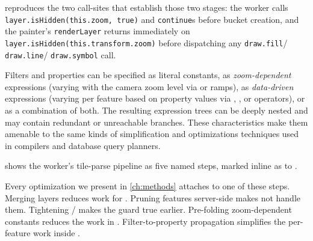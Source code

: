 \begin{description}
\begin{description}
 reproduces the two call-sites that establish those two stages: the worker calls \texttt{layer.isHidden(this.zoom, true)} and \texttt{continue}s before bucket creation, and the painter's \texttt{renderLayer} returns immediately on \texttt{layer.isHidden(this.transform.zoom)} before dispatching any \texttt{draw.fill}/ \texttt{draw.line}/ \texttt{draw.symbol} call.
\end{description}
\end{description}

Filters and properties can be specified as literal constants, as \emph{zoom-dependent} expressions (varying with the camera zoom level via  or  ramps), as \emph{data-driven} expressions (varying per feature based on property values via , , or  operators), or as a combination of both.
The resulting expression trees can be deeply nested and may contain redundant or unreachable branches.
These characteristics make them amenable to the same kinds of simplification and optimizations techniques used in compilers and database query planners.

 shows the worker's tile-parse pipeline as five named steps, marked inline as  to .

\noindent Every optimization we present in \cref{ch:methods} attaches to one of these steps.
Merging layers reduces work for .
Pruning features server-side makes  not handle them.
Tightening /  makes the  guard true earlier.
Pre-folding zoom-dependent constants reduces the work in .
Filter-to-property propagation simplifies the per-feature work inside .

